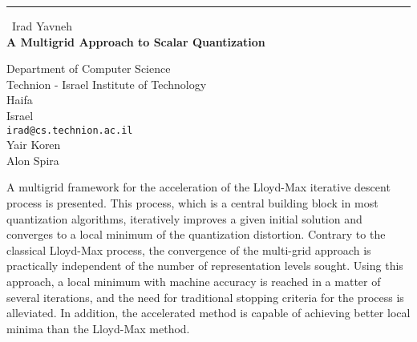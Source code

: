 \documentclass{report}
\begin{document}
\begin{center}
\rule{6in}{1pt} \
{\large Irad Yavneh \\
{\bf A Multigrid Approach to Scalar Quantization}}

Department of Computer Science \\ Technion - Israel Institute of Technology \\ Haifa \\ Israel
\\
{\tt irad@cs.technion.ac.il}\\
Yair Koren\\
Alon Spira\end{center}

A multigrid framework for the acceleration of the Lloyd-Max
iterative descent process is presented. This process, which is a
central building block in most quantization algorithms,
iteratively improves a given initial solution and converges to a
local minimum of the quantization distortion. Contrary to the
classical Lloyd-Max process, the convergence of the multi-grid
approach is practically independent of the number of representation
levels sought. Using this approach, a
local minimum with machine accuracy is reached in a matter of
several iterations, and the need for traditional stopping criteria for
the process is alleviated. In addition, the accelerated method is capable
of achieving better local minima than the Lloyd-Max method.
\end{document}
